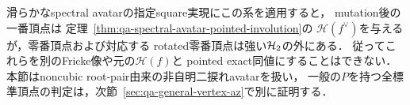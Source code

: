 \begin{remark}
滑らかなspectral avatarの指定square実現にこの系を適用すると，
mutation後の一番頂点は
定理~\ref{thm:qa-spectral-avatar-pointed-involution}の
$\mathcal H(f^\vee)$を与えるが，零番頂点および対応する
rotated零番頂点は強い$\mathcal H_2$の外にある．
従ってこれらを別のFricke像や元の$\mathcal H(f)$と
pointed exact同値にすることはできない．
本節はnoncubic root-pair由来の非自明二捩れavatarを扱い，
一般の$P$を持つ全標準頂点の判定は，次節~\ref{sec:qa-general-vertex-az}で別に証明する．
\end{remark}
